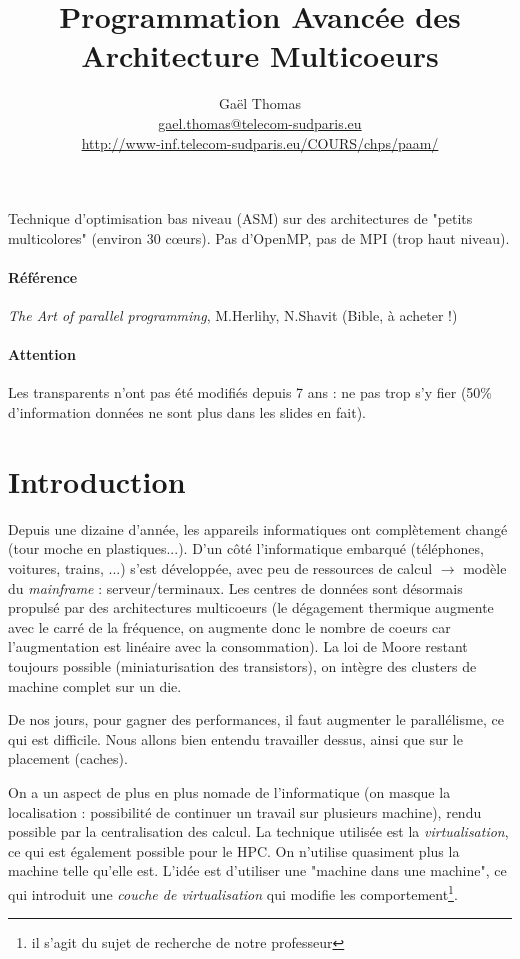 \documentclass{article}
\title{Programmation Avancée des Architecture Multicoeurs}
\author{Gaël Thomas\\
\url{gael.thomas@telecom-sudparis.eu}\\
\url{http://www-inf.telecom-sudparis.eu/COURS/chps/paam/}}
\date{}
\begin{document}
\maketitle
\tableofcontents
\newpage


Technique d'optimisation bas niveau (ASM) sur des architectures de "petits multicolores" (environ 30 cœurs). Pas d'OpenMP, pas de MPI (trop haut niveau).

\paragraph{Référence} \emph{The Art of parallel programming}, M.Herlihy, N.Shavit (Bible, à acheter !)

\paragraph{Attention} Les transparents n'ont pas été modifiés depuis 7 ans : ne pas trop s'y fier (50\% d'information données ne sont plus dans les slides en fait).

\section{Introduction}
Depuis une dizaine d'année, les appareils informatiques ont complètement changé (tour moche en plastiques...). D'un côté l'informatique embarqué (téléphones, voitures, trains, ...) s'est développée, avec peu de ressources de calcul $\to$ modèle du \emph{mainframe} : serveur/terminaux. Les centres de données sont désormais propulsé par des architectures multicoeurs (le dégagement thermique augmente avec le carré de la fréquence, on augmente donc le nombre de coeurs car l'augmentation est linéaire avec la consommation). La loi de Moore restant toujours possible (miniaturisation des transistors), on intègre des clusters de machine complet sur un die.

De nos jours, pour gagner des performances, il faut augmenter le parallélisme, ce qui est difficile. Nous allons bien entendu travailler dessus, ainsi que sur le placement (caches).

On a un aspect de plus en plus nomade de l'informatique (on masque la localisation : possibilité de continuer un travail sur plusieurs machine), rendu possible par la centralisation des calcul. La technique utilisée est la \emph{virtualisation}, ce qui est également possible pour le HPC. On n'utilise quasiment plus la machine telle qu'elle est. L'idée est d'utiliser une "machine dans une machine", ce qui introduit une \emph{couche de virtualisation} qui modifie les comportement\footnote{il s'agit du sujet de recherche de notre professeur}.
\end{document}
